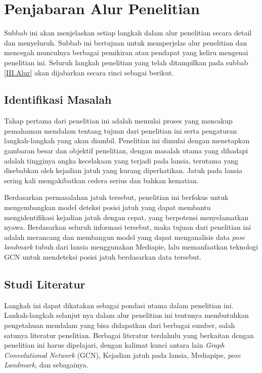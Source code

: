 \section{Penjabaran Alur Penelitian} \label{III.Jabar Alur}
Subbab ini akan menjelaskan setiap langkah dalam alur penelitian secara detail dan menyeluruh. Subbab ini bertujuan untuk memperjelas alur penelitian dan mencegah munculnya berbagai pemikiran atau pendapat yang keliru mengenai penelitian ini. Seluruh langkah penelitian yang telah ditampilkan pada subbab \ref{III.Alur} akan dijabarkan secara rinci sebagai berikut. \par

\subsection{Identifikasi Masalah} \label{III.identifikasi masalah}
Tahap pertama dari penelitian ini adalah memulai proses yang mencakup pemahaman mendalam tentang tujuan dari penelitian ini serta pengaturan langkah-langkah yang akan diambil. Penelitian ini dimulai dengan menetapkan gambaran besar dan objektif penelitian, dengan masalah utama yang dihadapi adalah tingginya angka kecelakaan yang terjadi pada lansia, terutama yang disebabkan oleh kejadian jatuh yang kurang diperhatikan. Jatuh pada lansia sering kali mengakibatkan cedera serius dan bahkan kematian. \par

Berdasarkan permasalahan jatuh tersebut, penelitian ini berfokus untuk mengembangkan model deteksi posisi jatuh yang dapat membantu mengidentifikasi kejadian jatuh dengan cepat, yang berpotensi menyelamatkan nyawa. Berdasarkan seluruh informasi tersebut, maka tujuan dari penelitian ini adalah  merancang dan membangun model yang dapat menganalisis data \textit{pose landmark} tubuh dari lansia menggunakan Mediapie, lalu memanfaatkan teknologi GCN untuk mendeteksi posisi jatuh berdasarkan data tersebut. \par

\subsection{Studi Literatur} \label{III.studi literatur}
Langkah ini dapat dikatakan sebagai pondasi utama dalam penelitian ini. Lankah-langkah selanjut nya dalam alur penelitian ini tentunya membutuhkan pengetahuan mendalam yang bisa didapatkan dari berbagai sumber, salah satunya literatur penelitian. Berbagai literatur terdahulu yang berkaitan dengan penelitian ini harus dipelajari, dengan kalimat kunci antara lain \textit{Graph Convolutional Network} (GCN), Kejadian jatuh pada lansia, Mediapipe, \textit{pose Landmark}, dan sebagainya. \par

